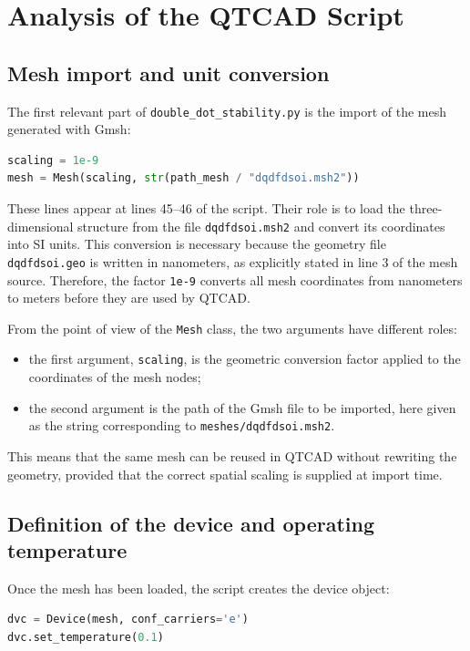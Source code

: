 \chapter{Analysis of the QTCAD Script}

\section{Mesh import and unit conversion}
The first relevant part of \texttt{double\_dot\_stability.py} is the import of the mesh generated with Gmsh:

\begin{lstlisting}[language=Python, caption={Mesh loading in the QTCAD script.}]
scaling = 1e-9
mesh = Mesh(scaling, str(path_mesh / "dqdfdsoi.msh2"))
\end{lstlisting}

These lines appear at lines 45--46 of the script. Their role is to load the three-dimensional structure from the file \texttt{dqdfdsoi.msh2} and convert its coordinates into SI units. This conversion is necessary because the geometry file \texttt{dqdfdsoi.geo} is written in nanometers, as explicitly stated in line 3 of the mesh source. Therefore, the factor \texttt{1e-9} converts all mesh coordinates from nanometers to meters before they are used by QTCAD.

From the point of view of the \texttt{Mesh} class, the two arguments have different roles:
\begin{itemize}
    \item the first argument, \texttt{scaling}, is the geometric conversion factor applied to the coordinates of the mesh nodes;
    \item the second argument is the path of the Gmsh file to be imported, here given as the string corresponding to \texttt{meshes/dqdfdsoi.msh2}.
\end{itemize}

This means that the same mesh can be reused in QTCAD without rewriting the geometry, provided that the correct spatial scaling is supplied at import time.

\section{Definition of the device and operating temperature}
Once the mesh has been loaded, the script creates the device object:

\begin{lstlisting}[language=Python, caption={Device creation and temperature assignment.}]
dvc = Device(mesh, conf_carriers='e')
dvc.set_temperature(0.1)
\end{lstlisting}

